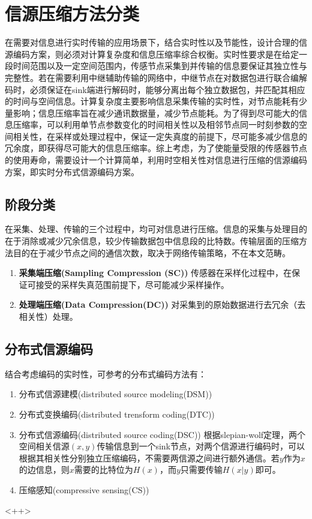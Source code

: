 \section{信源压缩方法分类}

在需要对信息进行实时传输的应用场景下，结合实时性以及节能性，设计合理的信源编码方案，则必须对计算复杂度和信息压缩率综合权衡。实时性要求是在给定一段时间范围以及一定空间范围内，传感节点采集到并传输的信息要保证其独立性与完整性。若在需要利用中继辅助传输的网络中，中继节点在对数据包进行联合编解码时，必须保证在sink端进行解码时，能够分离出每个独立数据包，并匹配其相应的时间与空间信息。计算复杂度主要影响信息采集传输的实时性，对节点能耗有少量影响；信息压缩率旨在减少通讯数据量，减少节点能耗。为了得到尽可能大的信息压缩率，可以利用单节点参数变化的时间相关性以及相邻节点同一时刻参数的空间相关性，在采样或处理过程中，保证一定失真度的前提下，尽可能多减少信息的冗余度，即获得尽可能大的信息压缩率。综上考虑，为了使能量受限的传感器节点的使用寿命，需要设计一个计算简单，利用时空相关性对信息进行压缩的信源编码方案，即实时分布式信源编码方案。

\subsection{阶段分类}
在采集、处理、传输的三个过程中，均可对信息进行压缩。信息的采集与处理目的在于消除或减少冗余信息，较少传输数据包中信息段的比特数。传输层面的压缩方法目的在于减少节点之间的通信次数，取决于网络传输策略，不在本文范畴。
\begin{enumerate}
	\item \textbf{采集端压缩(Sampling Compression (SC))} 传感器在采样化过程中，在保证可接受的采样失真范围前提下，尽可能减少采样操作。
        \item \textbf{处理端压缩(Data Compression(DC))} 对采集到的原始数据进行去冗余（去相关性）处理。
\end{enumerate}

\subsection{分布式信源编码}
结合考虑编码的实时性，可参考的分布式编码方法有：
\begin{enumerate}
    \item 分布式信源建模(distributed source modeling(DSM))
    \item 分布式变换编码(distributed trensform coding(DTC))
    \item 分布式信源编码(distributed source coding(DSC)) 根据slepian-wolf定理，两个空间相关信源$(x,y)$传输信息到一个sink节点，对两个信源进行编码时，可以根据其相关性分别独立压缩编码，不需要两信源之间进行额外通信。若$y$作为$x$的边信息，则$x$需要的比特位为$H(x)$，而$y$只需要传输$H(x|y)$即可。
    \item 压缩感知(compressive sensing(CS)) 
\end{enumerate}<++>
